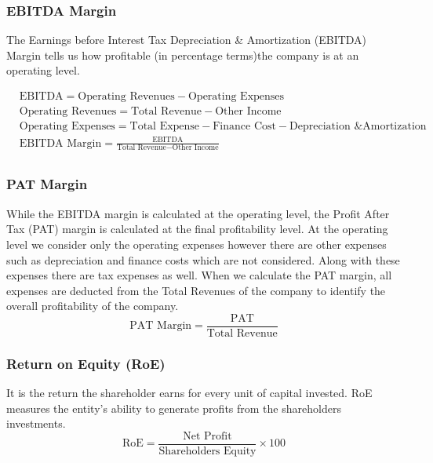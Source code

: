 \subsubsection{EBITDA Margin}
The Earnings before Interest Tax Depreciation \& Amortization (EBITDA) Margin tells us how profitable (in percentage terms)the company is at an operating level.

\begin{align*}
  & \textrm{EBITDA} = \textrm{Operating Revenues} - \textrm{Operating Expenses} \\
  & \textrm{Operating Revenues} = \textrm{Total Revenue} - \textrm{Other Income} \\
  & \textrm{Operating Expenses} = \textrm{Total Expense} - \textrm{Finance Cost} - \textrm{Depreciation \& Amortization} \\
  & \textrm{EBITDA Margin} = \frac{\textrm{EBITDA}}{\textrm{Total Revenue} - \textrm{Other Income}} \\
\end{align*}

\subsubsection{PAT Margin}
While the EBITDA margin is calculated at the operating level, the Profit After Tax (PAT) margin is calculated at the final profitability level. At the operating level we consider only the operating expenses however there are other expenses such as depreciation and finance costs which are not considered. Along with these expenses there are tax expenses as well. When we calculate the PAT margin, all expenses are deducted from the Total Revenues of the company to identify the overall profitability of the company.
\begin{displaymath}
  \textrm{PAT Margin} = \frac{\textrm{PAT}}{\textrm{Total Revenue}}
\end{displaymath}

\subsubsection{Return on Equity (RoE)}
It is the return the shareholder earns for every unit of capital invested. RoE measures the entity’s ability to generate profits from the shareholders investments.
\begin{displaymath}
  \textrm{RoE} = \frac{\textrm{Net Profit}}{\textrm{Shareholders Equity}} \times 100
\end{displaymath}


